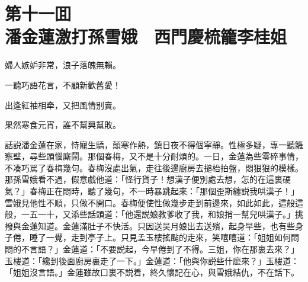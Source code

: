 
\chapter*{第十一囬　\\潘金蓮激打孫雪娥　西門慶梳籠李桂姐}


\begin{myquote}
婦人嫉妒非常，浪子落魄無賴。

一聽巧語花言，不顧新歡舊愛！

出逢紅袖相牵，又把風情别賣。

果然寒食元宵，誰不幫興幫敗。
\end{myquote}

話説潘金蓮在家，恃寵生驕，顛寒作熱，鎮日夜不得個寜靜。性極多疑，專一聽籬察壁，尋些頭惱廝鬧。那個春梅，又不是十分耐煩的。一日，金蓮為些零碎事情，不凑巧駡了春梅幾句。春梅沒處出氣，走往後邊廚房去搥枱拍盤，悶狠狠的模樣。那孫雪娥看不過，假意戲他道：「怪行貨子！想漢子便別處去想，怎的在這裏硬氣？」春梅正在悶時，聽了幾句，不一時暴跳起來：「那個歪斯纏説我哄漢子！」雪娥見他性不順，只做不開口。春梅便使性做幾步走到前邊來，如此如此，這般這般，一五一十，又添些話頭道：「他還説娘教爹收了我，和娘捎一幫兒哄漢子。」挑撥與金蓮知道。金蓮滿肚子不快活。只因送吴月娘出去送殯，起身早些，也有些身子倦，睡了一覺，走到亭子上。只見孟玉樓搖颭的走來，笑嘻嘻道：「姐姐如何悶悶的不言語？」金蓮道：「不要説起，今早倦到了不得。三姐，你在那裏去來？」玉樓道：「纔到後面廚房裏走了一下。」金蓮道：「他與你説些什麽來？」玉樓道：「姐姐沒言語。」金蓮雖故口裏不説着，終久懷記在心，與雪娥結仇，不在話下。

